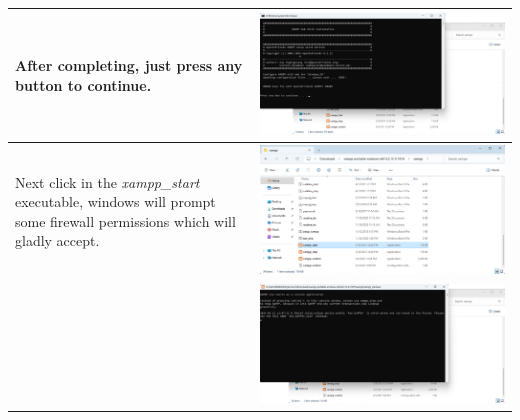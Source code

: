 \documentclass[11pt,a4paper]{report}
\begin{document}
\begin{flushleft}
\begin{center}
\begin{longtable}{ m{5cm} l }
                        After completing, just press any button to continue.
                        & \includegraphics[scale=0.303,valign=c]{phase1/images/install_xampp09} \\
                        \hline
                        
                        Next click in the \textit{xampp\_start} executable, windows will prompt some firewall permissions which will gladly accept.
                        & \includegraphics[scale=0.35,valign=c]{phase1/images/install_xampp10} \\
                        & \includegraphics[scale=0.303,valign=c]{phase1/images/install_xampp13} \\
                        \hline
                        

\end{longtable}
\end{center}
\end{flushleft}
\end{document}
